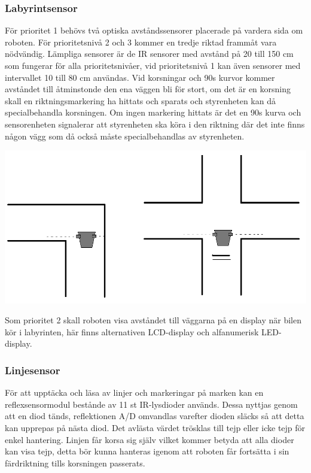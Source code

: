 \documentclass[a4paper,12pt]{article}
\begin{document}
\subsubsection{Labyrintsensor}
För prioritet 1 behövs två  optiska avståndssensorer placerade på vardera sida om roboten. För prioritetsnivå 2 och 3 kommer en tredje riktad frammåt vara nödvändig. Lämpliga sensorer är de IR sensorer med avstånd på 20 till 150 cm som fungerar för alla prioritetsnivåer, vid prioritetsnivå 1 kan även sensorer med intervallet 10 till 80 cm användas.
Vid korsningar och 90\degree s kurvor kommer avståndet till åtminstonde den ena väggen bli för stort, om det är en korsning skall en riktningsmarkering ha hittats och sparats och styrenheten kan då specialbehandla korsningen. Om ingen markering hittats är det en 90\degree s kurva och sensorenheten signalerar att styrenheten ska köra i den riktning där det inte finns någon vägg som då också måste specialbehandlas av styrenheten.
\begin{center}
\includegraphics[scale=0.45]{korsningar.png}
\end{center}


Som prioritet 2 skall roboten visa avståndet till väggarna på en display när bilen kör i labyrinten, här finns alternativen LCD-display och alfanumerisk LED-display.

\subsubsection{Linjesensor}
För att upptäcka och läsa av linjer och markeringar på marken kan en reflexsensormodul bestånde av 11 st IR-lysdioder används. Dessa nyttjas genom att en diod tänds, reflektionen A/D omvandlas varefter dioden släcks så att detta kan upprepas på nästa diod. Det avlästa värdet trösklas till tejp eller icke tejp för enkel hantering. 
Linjen får korsa sig själv vilket kommer betyda att alla dioder kan visa tejp, detta bör kunna hanteras igenom att roboten får fortsätta i sin färdriktning tills korsningen passerats.
\end{document}
